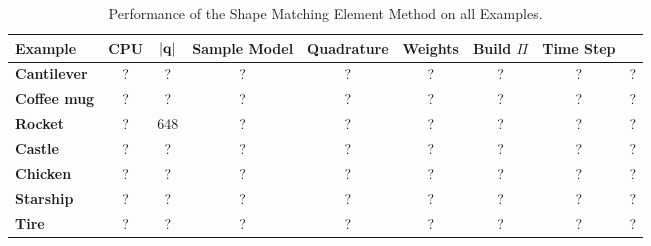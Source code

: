 \begin{table}[h]
  \caption{Performance of the Shape Matching Element Method on all Examples. }
  \label{tbl:perf}
  \begin{center}
  \begin{tabular}{l c c c c c c c c}
   \textbf{Example} & \textbf{CPU} & $|\mathbf{q}|$ &  \textbf{Sample Model} & \textbf{Quadrature} & \textbf{Weights} & \textbf{Build $\Pi$} & \textbf{Time Step} \\
   \hline 
   \rowcolor[HTML]{DAE8FC} 
   \textbf{Cantilever}      & ? & ? & ? & ? & ? & ? & ? & ? \\
   \textbf{Coffee mug}      & ? & ? & ? & ? & ? & ? & ? & ? \\
   \textbf{Rocket}          & ? & 648 & ? & ? & ? & ? & ? & ? \\
   \textbf{Castle}          & ? & ? & ? & ? & ? & ? & ? & ? \\
   \textbf{Chicken}         & ? & ? & ? & ? & ? & ? & ? & ? \\
   \textbf{Starship}        & ? & ? & ? & ? & ? & ? & ? & ? \\
   \textbf{Tire}            & ? & ? & ? & ? & ? & ? & ? & ? \\
   \hline
  \end{tabular}
  \end{center}
  
  \end{table}


